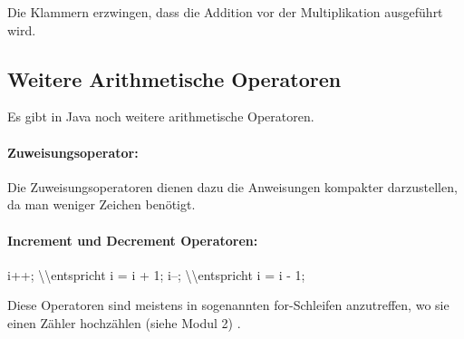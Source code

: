 \documentclass[10pt,paper=17cm:22cm, twoside=true, DIV=14]{scrbook}
\newenvironment {Shaded}
        {\begin{mdframed}[style=code] }
         {\end{mdframed}}
\newcommand{\DecValTok}[1]{\textcolor[rgb]{0.4,0.4,0.4}{{#1}}}
\newcommand{\NormalTok}[1]{#1}
\begin{document}
Die Klammern erzwingen, dass die Addition vor der Multiplikation
ausgeführt wird.

\subsection{Weitere Arithmetische
Operatoren}\label{weitere-arithmetische-operatoren}

Es gibt in Java noch weitere arithmetische Operatoren.

\paragraph{Zuweisungsoperator:}\label{zuweisungsoperator}

\begin{Shaded}
\end{Shaded}

Die Zuweisungsoperatoren dienen dazu die Anweisungen kompakter
darzustellen, da man weniger Zeichen benötigt.

\paragraph{Increment und Decrement
Operatoren:}\label{increment-und-decrement-operatoren}

\begin{Shaded}
\begin{Highlighting}[]
\NormalTok{i++; \textbackslash{}\textbackslash{}entspricht i = i + }\DecValTok{1}\NormalTok{;}
\NormalTok{i--; \textbackslash{}\textbackslash{}entspricht i = i - }\DecValTok{1}\NormalTok{;}
\end{Highlighting}
\end{Shaded}

Diese Operatoren sind meistens in sogenannten for-Schleifen anzutreffen,
wo sie einen Zähler hochzählen (siehe Modul 2) .
\end{document}
